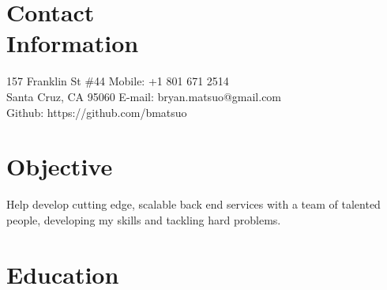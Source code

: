 \documentclass[margin,line]{resume}
\begin{document}
\begin{resume}

    \section{\mysidestyle Contact\\Information}

    157 Franklin St \#44            \hfill Mobile: +1 801 671 2514         \vspace{0mm}\\\vspace{0mm}%
    Santa Cruz, CA 95060            \hfill E-mail: bryan.matsuo@gmail.com   \vspace{0mm}\\\vspace{-4.5mm}%
                                    \hfill Github: https://github.com/bmatsuo   \vspace{0mm}\\\vspace{-4.5mm}%


    \section{\mysidestyle Objective}

    Help develop cutting edge, scalable back end services with a team of talented people, developing my skills and
    tackling hard problems.


    \section{\mysidestyle Education}


\end{resume}
\end{document}
